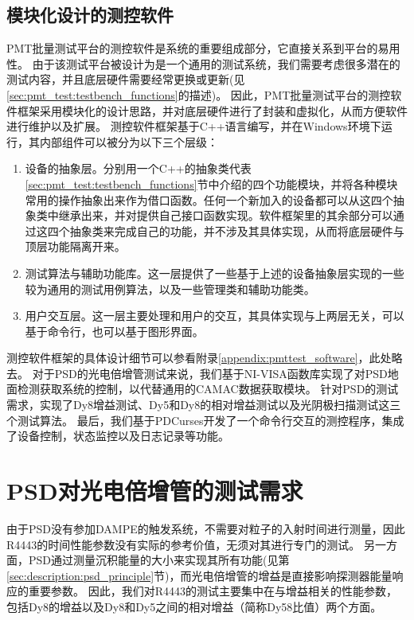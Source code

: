 \subsection{模块化设计的测控软件}
\label{sec:pmt_test:software}
PMT批量测试平台的测控软件是系统的重要组成部分，它直接关系到平台的易用性。
由于该测试平台被设计为是一个通用的测试系统，我们需要考虑很多潜在的测试内容，并且底层硬件需要经常更换或更新(见\ref{sec:pmt_test:testbench_functions}的描述)。
因此，PMT批量测试平台的测控软件框架采用模块化的设计思路，并对底层硬件进行了封装和虚拟化，从而方便软件进行维护以及扩展。
测控软件框架基于C++语言编写，并在Windows环境下运行，其内部组件可以被分为以下三个层级：
\begin{enumerate}
	\item 设备的抽象层。分别用一个C++的抽象类代表\ref{sec:pmt_test:testbench_functions}节中介绍的四个功能模块，并将各种模块常用的操作抽象出来作为借口函数。任何一个新加入的设备都可以从这四个抽象类中继承出来，并对提供自己接口函数实现。软件框架里的其余部分可以通过这四个抽象类来完成自己的功能，并不涉及其具体实现，从而将底层硬件与顶层功能隔离开来。
	\item 测试算法与辅助功能库。这一层提供了一些基于上述的设备抽象层实现的一些较为通用的测试用例算法，以及一些管理类和辅助功能类。
	\item 用户交互层。这一层主要处理和用户的交互，其具体实现与上两层无关，可以基于命令行，也可以基于图形界面。
\end{enumerate}
测控软件框架的具体设计细节可以参看附录\ref{appendix:pmttest_software}，此处略去。
对于PSD的光电倍增管测试来说，我们基于NI-VISA\cite{ni_visa}函数库实现了对PSD地面检测获取系统的控制，以代替通用的CAMAC数据获取模块。
针对PSD的测试需求，实现了Dy8增益测试、Dy5和Dy8的相对增益测试以及光阴极扫描测试这三个测试算法。
最后，我们基于PDCurses\cite{pdcurses}开发了一个命令行交互的测控程序，集成了设备控制，状态监控以及日志记录等功能。

\section{PSD对光电倍增管的测试需求}
\label{sec:pmt_test:test_requirement}
由于PSD没有参加DAMPE的触发系统，不需要对粒子的入射时间进行测量，因此R4443的时间性能参数没有实际的参考价值，无须对其进行专门的测试。
另一方面，PSD通过测量沉积能量的大小来实现其所有功能(见第\ref{sec:description:psd_principle}节)，而光电倍增管的增益是直接影响探测器能量响应的重要参数。
因此，我们对R4443的测试主要集中在与增益相关的性能参数，包括Dy8的增益以及Dy8和Dy5之间的相对增益（简称Dy58比值）两个方面。


